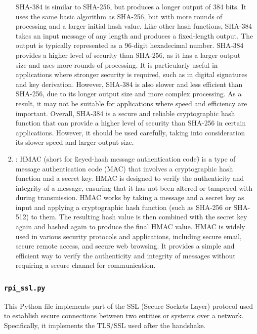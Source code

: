 \documentclass{article}
\newcommand{\code}[1]{\tcbox[
    on line,
    colback=codebackground, boxsep=2pt,
    colframe=white, boxrule=0pt,
    top=0pt, bottom=0pt, left=0pt, right=0pt
]{\texttt{#1}}}
\begin{document}
\begin{enumerate}
          SHA-384 is similar to SHA-256, but produces a longer output of 384 bits.
          It uses the same basic algorithm as SHA-256, but with more rounds of processing and a larger initial hash value.
          Like other hash functions, SHA-384 takes an input message of any length and produces a fixed-length output.
          The output is typically represented as a 96-digit hexadecimal number.
          SHA-384 provides a higher level of security than SHA-256, as it has a larger output size and uses more rounds of processing.
          It is particularly useful in applications where stronger security is required, such as in digital signatures and key derivation.
          However, SHA-384 is also slower and less efficient than SHA-256, due to its longer output size and more complex processing.
          As a result, it may not be suitable for applications where speed and efficiency are important.
          Overall, SHA-384 is a secure and reliable cryptographic hash function that can provide a higher level of security than SHA-256 in certain applications.
          However, it should be used carefully, taking into consideration its slower speed and larger output size.
    \item \code{HMAC()}:
          HMAC (short for \"keyed-hash message authentication code\") is a type of message authentication code (MAC) that involves a cryptographic hash function and a secret key.
          HMAC is designed to verify the authenticity and integrity of a message, ensuring that it has not been altered or tampered with during transmission.
          HMAC works by taking a message and a secret key as input and applying a cryptographic hash function (such as SHA-256 or SHA-512) to them.
          The resulting hash value is then combined with the secret key again and hashed again to produce the final HMAC value.
          HMAC is widely used in various security protocols and applications, including secure email, secure remote access, and secure web browsing.
          It provides a simple and efficient way to verify the authenticity and integrity of messages without requiring a secure channel for communication.
\end{enumerate}


\subsubsection{\texttt{rpi\_ssl.py}}
This Python file implements part of the SSL (Secure Sockets Layer) protocol
used to establish secure connections between two entities or systems over a network.
Specifically, it implements the TLS/SSL \code{Session} used after the handshake.
\end{document}
